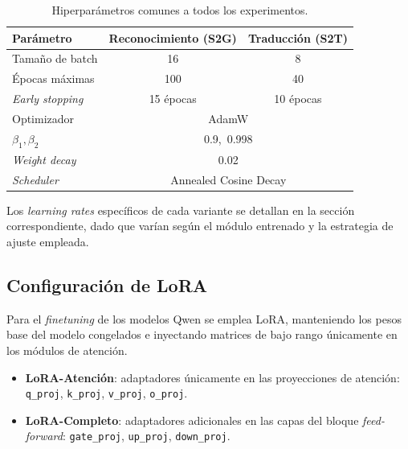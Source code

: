 \begin{table}[H]
	\centering
		\begin{tabular}{lcc}
			\hline
			\textbf{Parámetro}         & \textbf{Reconocimiento (S2G)} & \textbf{Traducción (S2T)} \\ \hline
			Tamaño de batch            & 16                            & 8                         \\
			Épocas máximas             & 100                           & 40                        \\
			\textit{Early stopping}    & 15 épocas                     & 10 épocas                 \\
			Optimizador                & \multicolumn{2}{c}{AdamW}                                 \\
			$\beta_1, \beta_2$         & \multicolumn{2}{c}{0.9,\ 0.998}                           \\
			\textit{Weight decay}      & \multicolumn{2}{c}{0.02}                                  \\
			\textit{Scheduler}         & \multicolumn{2}{c}{Annealed Cosine Decay}                 \\ \hline
		\end{tabular}
	\caption{Hiperparámetros comunes a todos los experimentos.}
	\label{tab:hyperparams}
\end{table}

Los \textit{learning rates} específicos de cada variante se detallan en la sección correspondiente, dado que varían según el módulo entrenado y la estrategia de ajuste empleada.


\subsection{Configuración de LoRA}
Para el \textit{finetuning} de los modelos Qwen se emplea LoRA, manteniendo los pesos base del modelo congelados e inyectando matrices de bajo rango únicamente en los módulos de atención.

\begin{itemize}
    \item \textbf{LoRA-Atención}: adaptadores únicamente en las proyecciones de atención: \texttt{q\_proj}, \texttt{k\_proj}, \texttt{v\_proj}, \texttt{o\_proj}.
    \item \textbf{LoRA-Completo}: adaptadores adicionales en las capas del bloque \textit{feed-forward}: \texttt{gate\_proj}, \texttt{up\_proj}, \texttt{down\_proj}.
\end{itemize}

